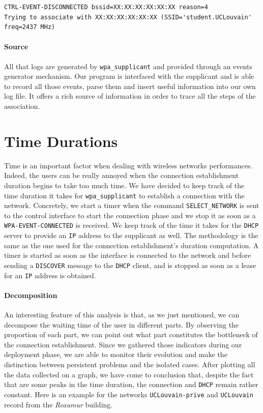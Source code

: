 \begin{lstlisting}[frame=single,breaklines=true,caption={Example of Deconnection trace}]
CTRL-EVENT-DISCONNECTED bssid=XX:XX:XX:XX:XX:XX reason=4
Trying to associate with XX:XX:XX:XX:XX:XX (SSID='student.UCLouvain' freq=2437 MHz)
\end{lstlisting}


\paragraph*{Source} All that logs are generated by \texttt{wpa\_supplicant} and provided through an events generator mechanism. Our program is interfaced with the supplicant and is able to record all those events, parse them and insert useful information into our own log file. It offers a rich source of information in order to trace all the steps of the association.


\section{Time Durations}
Time is an important factor when dealing with wireless networks performances. Indeed, the users can be really annoyed when the connection establishment duration begins to take too much time. We have decided to keep track of the time duration it takes for \texttt{wpa\_supplicant} to establish a connection with the network. Concretely, we start a timer when the command \texttt{SELECT\_NETWORK} is sent to the control interface to start the connection phase and we stop it as soon as a \texttt{WPA-EVENT-CONNECTED} is received. We keep track of the time it takes for the \texttt{DHCP} server to provide an \texttt{IP} address to the supplicant as well. The methodology is the same as the one used for the connection establishment's duration computation. A timer is started as soon as the interface is connected to the network and before sending a \texttt{DISCOVER} message to the \texttt{DHCP} client, and is stopped as soon as a lease for an \texttt{IP} address is obtained. 

\paragraph*{Decomposition} An interesting feature of this analysis is that, as we just mentioned, we can decompose the waiting time of the user in different parts. By observing the proportion of each part, we can point out what part constitutes the bottleneck of the connection establishment. Since we gathered those indicators during our deployment phase, we are able to monitor their evolution and make the distinction between persistent problems and the isolated cases. After plotting all the data collected on a graph, we have come to conclusion that, despite the fact that are some peaks in the time duration, the connection and \texttt{DHCP} remain rather constant. Here is an example for the networks \texttt{UCLouvain-prive} and \texttt{UCLouvain} record from the \emph{Reaumur} building.

